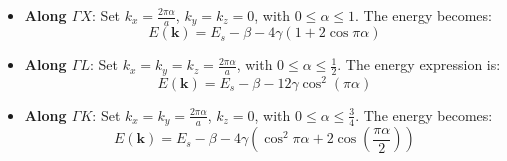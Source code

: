 \begin{itemize}
	\item \textbf{Along \( \Gamma X \)}: Set \( k_x = \frac{2\pi \alpha}{a} \), \( k_y = k_z = 0 \), with \( 0 \leq \alpha \leq 1 \). The energy becomes:
	      \begin{equation*}
		      E(\mathbf{k}) = E_s - \beta - 4\gamma (1 + 2 \cos \pi \alpha)
	      \end{equation*}
	\item \textbf{Along \( \Gamma L \)}: Set \( k_x = k_y = k_z = \frac{2\pi \alpha}{a} \), with \( 0 \leq \alpha \leq \frac{1}{2} \). The energy expression is:
	      \begin{equation*}
		      E(\mathbf{k}) = E_s - \beta - 12\gamma \cos^2(\pi \alpha)
	      \end{equation*}
	\item \textbf{Along \( \Gamma K \)}: Set \( k_x = k_y = \frac{2\pi \alpha}{a} \), \( k_z = 0 \), with \( 0 \leq \alpha \leq \frac{3}{4} \). The energy becomes:
	      \begin{equation*}
		      E(\mathbf{k}) = E_s - \beta - 4\gamma \left( \cos^2 \pi \alpha + 2 \cos\left( \frac{\pi \alpha}{2} \right) \right)
	      \end{equation*}
\end{itemize}

